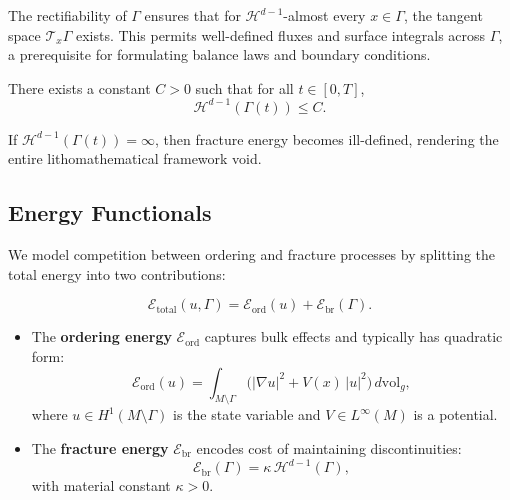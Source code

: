 \begin{remark}[Rectifiability]
The rectifiability of $\Gamma$ ensures that for $\mathcal{H}^{d-1}$-almost
every $x \in \Gamma$, the tangent space $\mathcal{T}_x \Gamma$ exists.
This permits well-defined fluxes and surface integrals across $\Gamma$,
a prerequisite for formulating balance laws and boundary conditions.
\end{remark}

\begin{assumption}
\label{ass:h2}
There exists a constant $C>0$ such that for all $t \in [0,T]$,
\[
\mathcal{H}^{d-1}(\Gamma(t)) \leq C.
\]
\end{assumption}

\begin{remark}[Sharpness of H2]
If $\mathcal{H}^{d-1}(\Gamma(t)) = \infty$, then fracture energy becomes
ill-defined, rendering the entire lithomathematical framework void.
\end{remark}

\bigskip


\subsection{Energy Functionals}

We model competition between ordering and fracture processes by
splitting the total energy into two contributions:

\[
\mathcal{E}_{\mathrm{total}}(u,\Gamma) =
\mathcal{E}_{\mathrm{ord}}(u) + \mathcal{E}_{\mathrm{br}}(\Gamma).
\]

\begin{itemize}
\item The \textbf{ordering energy} $\mathcal{E}_{\mathrm{ord}}$ captures
bulk effects and typically has quadratic form:
\[
\mathcal{E}_{\mathrm{ord}}(u) =
\int_{M\setminus \Gamma} \Big( |\nabla u|^2 + V(x)\,|u|^2 \Big)\,
d\mathrm{vol}_g,
\]
where $u \in H^1(M\setminus \Gamma)$ is the state variable and
$V \in L^\infty(M)$ is a potential.

\item The \textbf{fracture energy} $\mathcal{E}_{\mathrm{br}}$ encodes
cost of maintaining discontinuities:
\[
\mathcal{E}_{\mathrm{br}}(\Gamma) = \kappa \,\mathcal{H}^{d-1}(\Gamma),
\]
with material constant $\kappa>0$.
\end{itemize}

